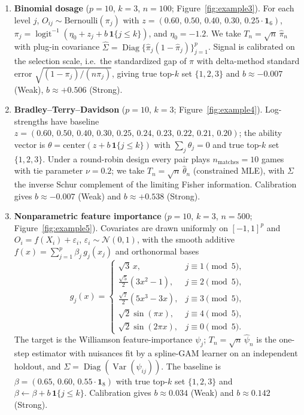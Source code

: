\documentclass[12pt]{article}
\begin{document}
\begin{appendices}
\begin{enumerate}[leftmargin=*]
\item \textbf{Binomial dosage} ($p=10$, $k=3$, $n=100$; Figure~\ref{fig:example3}).
For each level $j$, $O_{ij}\sim\mathrm{Bernoulli}(\pi_j)$ with $z=(0.60,\,0.50,\,0.40,\,0.30,\,0.25\cdot\mathbf 1_6)$,
$\pi_j=\operatorname{logit}^{-1}(\eta_0+z_j+b\,\mathbf 1\{j\le k\})$, and  $\eta_0=-1.2$. We take
$T_n=\sqrt n\,\widehat\pi_n$ with plug-in covariance
$\widehat\Sigma=\operatorname{Diag}\{\widehat\pi_j(1-\widehat\pi_j)\}_{j=1}^p$. Signal is
calibrated on the selection scale, i.e.\ the standardized gap of $\pi$ with
delta-method standard error $\sqrt{(1-\pi_j)/(n\pi_j)}$, giving true top-$k$ set
$\{1,2,3\}$ and $b\approx-0.007$ (Weak), $b\approx+0.506$ (Strong).
\item \textbf{Bradley--Terry--Davidson} ($p=10$, $k=3$; Figure~\ref{fig:example4}).
Log-strengths have baseline
$z=(0.60,\,0.50,\,0.40,\,0.30,\,0.25,\,0.24,\,0.23,\,0.22,\,0.21,\,0.20)$; the
ability vector is $\theta=\mathrm{center}(z+b\,\mathbf 1\{j\le k\})$ with
$\sum_j\theta_j=0$ and true top-$k$ set $\{1,2,3\}$. Under a round-robin design
every pair plays $n_{\mathrm{matches}}=10$ games with tie parameter $\nu=0.2$; we
take $T_n=\sqrt n\,\widehat\theta_n$ (constrained MLE), with $\Sigma$ the inverse
Schur complement of the limiting Fisher information. Calibration gives
$b\approx-0.007$ (Weak) and $b\approx+0.538$ (Strong).
\item \textbf{Nonparametric feature importance} ($p=10$, $k=3$, $n=500$;
Figure~\ref{fig:example5}). Covariates are drawn uniformly on $[-1,1]^p$ and
$O_i=f(X_i)+\varepsilon_i$, $\varepsilon_i\sim\mathcal N(0,1)$, with the smooth
additive $f(x)=\sum_{j=1}^p\beta_j\,g_j(x_j)$ and orthonormal bases
\[
g_j(x)=
\begin{cases}
\sqrt3\,x, & j\equiv1\pmod5,\\[0.4ex]
\tfrac{\sqrt5}{2}(3x^2-1), & j\equiv2\pmod5,\\[0.4ex]
\tfrac{\sqrt7}{2}(5x^3-3x), & j\equiv3\pmod5,\\[0.4ex]
\sqrt2\sin(\pi x), & j\equiv4\pmod5,\\[0.4ex]
\sqrt2\sin(2\pi x), & j\equiv0\pmod5.
\end{cases}
\]
The target is the Williamson feature-importance $\psi_j$; $T_n=\sqrt n\,\widehat\psi_n$
is the one-step estimator with nuisances fit by a spline-GAM learner on an
independent holdout, and $\Sigma=\operatorname{Diag}(\operatorname{Var}(\psi_{ij}))$.
The baseline is $\beta=(0.65,\,0.60,\,0.55\cdot\mathbf 1_8)$ with true top-$k$ set
$\{1,2,3\}$ and $\beta\gets\beta+b\,\mathbf 1\{j\le k\}$. Calibration gives
$b\approx0.034$ (Weak) and $b\approx0.142$ (Strong).
\end{enumerate}


\end{appendices}
\end{document}

